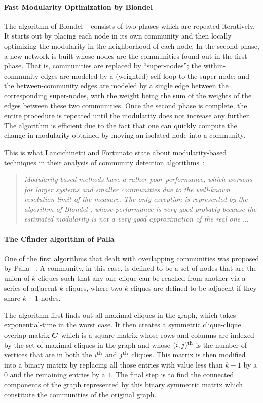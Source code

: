 \paragraph{Fast Modularity Optimization by Blondel \etal} 
The algorithm of Blondel \etal~\cite{BGLL08} consists of two phases which are repeated iteratively. 
It starts out by placing each node in its own community and then locally optimizing the modularity 
in the neighborhood of each node. In the second phase, a new network is built whose nodes are the 
communities found out in the first phase. That is, communities are replaced by ``super-nodes''; the 
within-community edges are modeled by a (weighted) self-loop to the super-node; and the between-community 
edges are modeled by a single edge between the corresponding super-nodes, with the weight being 
the sum of the weights of the edges between these two communities. 
Once the second phase is complete, the entire procedure is repeated until the modularity does not 
increase any further. The algorithm is efficient due to the fact that one can quickly compute the 
change in modularity obtained by moving an isolated node into a community.

This is what Lancichinetti and Fortunato state about modularity-based techniques in their analysis of 
community detection algorithms~\cite{LF09}: 
\begin{quote}
	\emph{Modularity-based methods have a rather poor performance, which worsens for larger systems and smaller 
	communities due to the well-known resolution limit of the measure. The only exception is represented 
	by the algorithm of Blondel \emph{\etal}, whose performance is very good probably because the estimated modularity 
	is not a very good approximation of the real one $\ldots$} 
\end{quote}

\paragraph{The Cfinder algorithm of Palla \etal} One of the first algorithms that dealt with overlapping 
communities was proposed by Palla \etal~\cite{PDFV05}. A community, in this case, is defined to be a set of nodes 
that are the union of $k$-cliques such that any one clique can be reached from another via a series of 
adjacent $k$-cliques, where two $k$-cliques are defined to be adjacent if they 
share $k - 1$ nodes. 

The algorithm first finds out all maximal cliques in the graph, which takes exponential-time
in the worst case. It then creates a symmetric clique-clique overlap matrix $\boldsymbol{C}$ which is a square matrix whose 
rows and columns are indexed by the set of maximal cliques in the graph and whose $(i, j)^{\textrm{th}}$ 
is the number of vertices that are in both the $i^{\textrm{th}}$ and $j^{\textrm{th}}$ cliques. This matrix is then modified into 
a binary matrix by replacing all those entries with value less than $k - 1$ by a $0$ and the remaining entries by 
a $1$. The final step is to find the connected components of the graph represented by this binary symmetric matrix
which constitute the communities of the original graph. 

